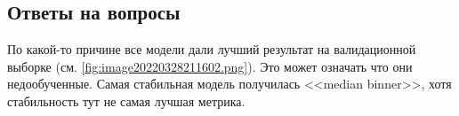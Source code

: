 \documentclass[12pt,a4paper]{article}
\begin{document}
\begin{Shaded}
\begin{Highlighting}[]
\NormalTok{table2[}\NormalTok{] }\OperatorTok{=}\NormalTok{ table2[}\NormalTok{] }\OperatorTok{{-}}\NormalTok{ table2[}\NormalTok{] }
\NormalTok{table2[}\NormalTok{] }\OperatorTok{=}\NormalTok{ table2[}\NormalTok{] }\OperatorTok{{-}}\NormalTok{ table2[}\NormalTok{] }
\end{Highlighting}
\end{Shaded}

  \subsection{Ответы на вопросы}
  По какой-то причине все модели дали лучший результат на валидационной выборке (см. \autoref{fig:image20220328211602.png}).
  Это может означать что они недообученные.
  Самая стабильная модель получилась <<median binner>>, хотя стабильность тут не самая лучшая метрика.

  \newpage
\end{document}
